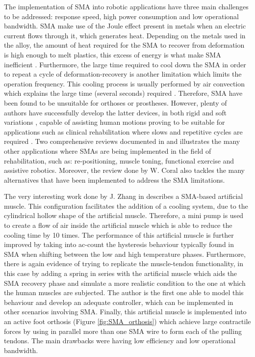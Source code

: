 The implementation of SMA into robotic applications have three main challenges to be addressed: response speed, high power consumption and low operational bandwidth. SMA make use of the Joule effect present in metals when an electric current flows through it, which generates heat. Depending on the metals used in the alloy, the amount of heat required for the SMA to recover from deformation is high enough to melt plastics, this excess of energy is what make SMA inefficient \cite{Bundhoo2009a}. Furthermore, the large time required to cool down the SMA in order to repeat a cycle of deformation-recovery is another limitation which limits the operation frequency. This cooling process is usually performed by air convection which explains the large time (several seconds) required \cite{Bundhoo2009}. Therefore, SMA have been found to be unsuitable for orthoses or prostheses. However, plenty of authors have successfully develop the latter devices, in both rigid \cite{Tarkesh2016} and soft variations \cite{Stirling2011}, capable of assisting human motions proving to be suitable for applications such as clinical rehabilitation where slows and repetitive cycles are required \cite{Pittaccio2009,Chenal2014}. Two comprehensive reviews documented in \cite{pittaccio2012shape} and \cite{Coral2012} illustrates the many other applications where SMAs are being implemented in the field of rehabilitation, such as: re-positioning, muscle toning, functional exercise and assistive robotics. Moreover, the review done by W. Coral also tackles the many alternatives that have been implemented to address the SMA limitations.

The very interesting work done by J. Zhang in \cite{Zhang2013a} describes a SMA-based artificial muscle. This configuration facilitates the addition of a cooling system, due to the cylindrical hollow shape of the artificial muscle. Therefore, a mini pump is used to create a flow of air inside the artificial muscle which is able to reduce the cooling time by 10 times. The performance of this artificial muscle is further improved by taking into ac-count the hysteresis behaviour typically found in SMA when shifting between the low and high temperature phases. Furthermore, there is again evidence of trying to replicate the muscle-tendon functionality, in this case by adding a spring in series with the artificial muscle which aids the SMA recovery phase and simulate a more realistic condition to the one at which the human muscles are subjected. The author is the first one able to model this behaviour and develop an adequate controller, which can be implemented in other scenarios involving SMA. Finally, this artificial muscle is implemented into an active foot orthosis (Figure \ref{fig:SMA_orthosis}) which achieve large contractile forces by using in parallel more than one SMA wire to form each of the pulling tendons. The main drawbacks were having low efficiency and low operational bandwidth.

